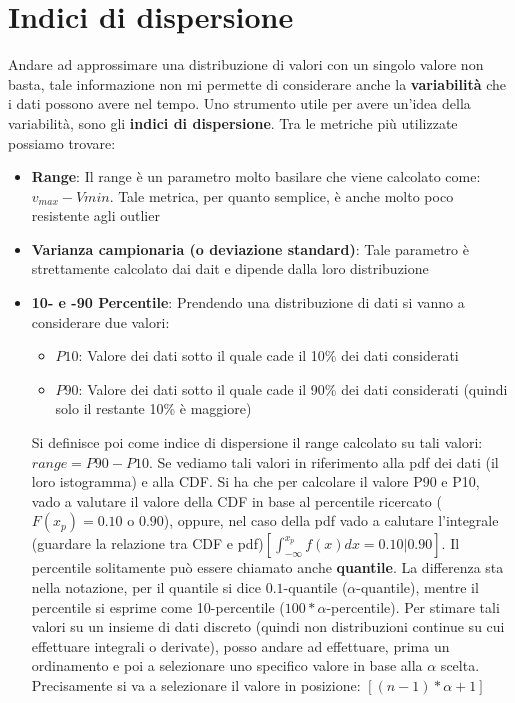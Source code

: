 \section{Indici di dispersione}
Andare ad approssimare una distribuzione di valori con un singolo valore non basta, tale informazione non mi permette di considerare anche la \textbf{variabilità} che i dati possono avere nel tempo.
Uno strumento utile per avere un'idea della variabilità, sono gli \textbf{indici di dispersione}. Tra le metriche più utilizzate possiamo trovare:
\begin{itemize}
\item \textbf{Range}: Il range è un parametro molto basilare che viene calcolato come: \(v_{max} - V{min}\). Tale metrica, per quanto semplice, è anche molto poco resistente agli outlier
\item \textbf{Varianza campionaria (o deviazione standard)}: Tale parametro è strettamente calcolato dai dait e dipende dalla loro distribuzione
\item \textbf{10- e -90 Percentile}: Prendendo una distribuzione di dati si vanno a considerare due valori:
\begin{itemize}
    \item \textbf{\(P10\)}: Valore dei dati sotto il quale cade il 10\% dei dati considerati
    \item \textbf{\(P90\)}: Valore dei dati sotto il quale cade il 90\% dei dati considerati (quindi solo il restante 10\% è maggiore)
\end{itemize}
Si definisce poi come indice di dispersione il range calcolato su tali valori: \(range = P90-P10\). Se vediamo tali valori in riferimento alla pdf dei dati (il loro istogramma) e alla CDF. Si ha che per calcolare il valore P90 e P10, vado a valutare il valore della CDF in base al percentile ricercato (\(F(x_p) = 0.10\) o \(0.90\)), oppure, nel caso della pdf vado a calutare l'integrale (guardare la relazione tra CDF e pdf)\(\left [\int_{-\infty}^{x_p}f(x)dx = 0.10 | 0.90\right ]\). Il percentile solitamente può essere chiamato anche \textbf{quantile}. La differenza sta nella notazione, per il quantile si dice \(0.1\)-quantile (\(\alpha\)-quantile), mentre il percentile si esprime come 10-percentile (\(100*\alpha\)-percentile). Per stimare tali valori su un insieme di dati discreto (quindi non distribuzioni continue su cui effettuare integrali o derivate), posso andare ad effettuare, prima un ordinamento e poi a selezionare uno specifico valore in base alla \(\alpha\) scelta. Precisamente si va a selezionare il valore in posizione: \([(n-1)*\alpha + 1]\)


\end{itemize}
